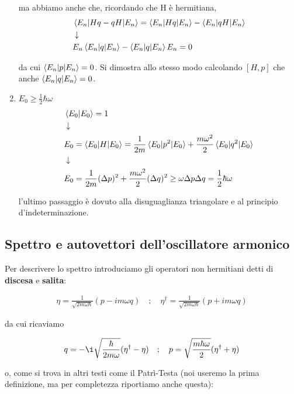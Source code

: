 \begin{enumerate}
	 ma abbiamo anche che, ricordando che H è hermitiana,
	 \begin{align}
	{}&\braket{E_n|Hq - qH|E_n} = \braket{E_n|Hq|E_n} - \braket{E_n|qH|E_n} \\ 
	&\downarrow \nonumber \\
	&E_n\braket{E_n|q|E_n} - \braket{E_n|q|E_n}E_n=0
	 \end{align}

	da cui $\braket{E_n|p|E_n}=0$. Si dimostra allo stesso modo calcolando $[H,p]$ che anche $\braket{E_n|q|E_n}=0$.

\item $E_0 \geq \frac{1}{2} \hbar \omega$
	\begin{align}
	{}&\braket{E_0|E_0}=1 \\
	 &\downarrow \nonumber \\ 
	 &E_0= \braket{E_0|H|E_0}= \frac{1}{2m}\braket{E_0|p^2|E_0} + \frac{m\omega^2}{2}\braket{E_0|q^2|E_0} \\
	 &\downarrow \nonumber \\ 
	 &E_0=  \frac{1}{2m}(\Delta p)^2 + \frac{m\omega^2}{2}(\Delta q)^2 \geq \omega \Delta p \Delta q = \frac{1}{2}\hbar \omega
	 \end{align}
	 
	 l'ultimo passaggio è dovuto alla disuguaglianza triangolare e al principio d'indeterminazione.
\end{enumerate}

\subsection{Spettro e autovettori dell'oscillatore armonico}

Per descrivere lo spettro introduciamo gli operatori non hermitiani detti di \textbf{discesa} e \textbf{salita}:

\begin{align}
\eta = \frac{1}{\sqrt{2m\omega\hbar}}(p - im\omega q) \quad ; \quad \eta^\dagger =\frac{1}{\sqrt{2m\omega\hbar}}(p + im\omega q)
\end{align}

da cui ricaviamo

\begin{align}
q= -\i \sqrt{\frac{\hbar}{2m\omega}}(\eta^\dagger - \eta )  \quad ; \quad p = \sqrt{\frac{m\hbar\omega}{2}}(\eta^\dagger + \eta ) 
\end{align}

o, come si trova in altri testi come il Patrì-Testa (noi useremo la prima definizione, ma per completezza riportiamo anche questa):

